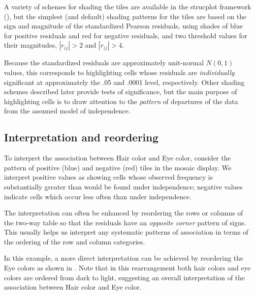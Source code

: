\documentclass[10pt,krantz2]{krantz}\usepackage[]{graphicx}\usepackage[]{color}
\begin{document}
A variety of schemes for shading the tiles are available in the
strucplot framework (),
but the simplest (and default) shading patterns for the tiles are based on
the sign and magnitude of the
standardized Pearson residuals, using shades of blue for positive residuals
and red for negative residuals, and two threshold values for their magnitudes,
$|r_{ij}| > 2$ and $|r_{ij}| > 4$.

Because the standardized residuals are approximately unit-normal $N(0,1)$
values,  this corresponds to highlighting cells whose
residuals are \emph{individually} significant at approximately
the .05 and .0001 level, respectively.
Other shading schemes described later provide tests of significance,
but the main purpose  of highlighting cells is to draw attention to the \emph{pattern}
of departures of the data from the assumed model of independence.

\subsection{Interpretation and reordering}

To interpret the association between Hair color and Eye color,
consider the pattern of positive (blue) and negative (red)
tiles in the mosaic display.
We interpret positive values as showing cells whose observed frequency
is substantially greater than would be found under independence;
negative values indicate cells which occur less often than
under independence.

The interpretation can often be enhanced by reordering the rows or columns
of the two-way table so that the residuals have an \emph{opposite
corner} pattern of signs.  This usually helps us interpret any systematic
patterns of association in terms of the ordering of the row and column
categories.

In this example, a more direct interpretation can be achieved by
reordering the Eye colors as shown in
.
Note that in this rearrangement
both hair colors and eye colors are ordered from dark to light,
suggesting an overall interpretation of the association
between Hair color and Eye color.
\end{document}
